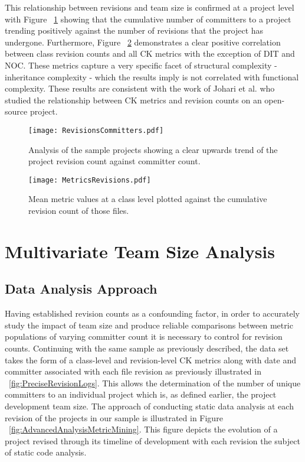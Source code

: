 This relationship between revisions and team size is confirmed at a project level with Figure ~\ref{fig:RevisionsCommitters} showing that the cumulative number of committers to a project trending positively against the number of revisions that the project has undergone. Furthermore, Figure ~\ref{fig:MetricsRevisions} demonstrates a clear positive correlation between class revision counts and all CK metrics with the exception of DIT and NOC. These metrics capture a very specific facet of structural complexity - inheritance complexity - which the results imply is not correlated with functional complexity. These results are consistent with the work of Johari et al. \citep{johari2012validation} who studied the relationship between CK metrics and revision counts on an open-source project. 

\begin{figure}[htbp!] 
\centering    
\texttt{[image: RevisionsCommitters.pdf]}
\caption{Analysis of the sample projects showing a clear upwards trend of the project revision count against committer count.}
\label{fig:RevisionsCommitters}
\end{figure}

\begin{figure}[htbp!] 
\centering    
\texttt{[image: MetricsRevisions.pdf]}
\caption{Mean metric values at a class level plotted against the cumulative revision count of those files.}
\label{fig:MetricsRevisions}
\end{figure}

\section{Multivariate Team Size Analysis} %

\subsection{Data Analysis Approach}
Having established revision counts as a confounding factor, in order to accurately study the impact of team size and produce reliable comparisons between metric populations of varying committer count it is necessary to control for revision counts. Continuing with the same sample as previously described, the data set takes the form of a class-level and revision-level CK metrics along with date and committer associated with each file revision as previously illustrated in ~\ref{fig:PreciseRevisionLogs}. This allows the determination of the number of unique committers to an individual project which is, as defined earlier, the project development team size. The approach of conducting static data analysis at each revision of the projects in our sample is illustrated in Figure ~\ref{fig:AdvancedAnalysisMetricMining}. This figure depicts the evolution of a project revised through its timeline of development with each revision the subject of static code analysis. 

